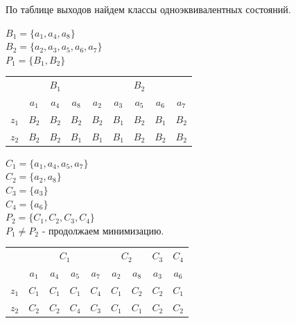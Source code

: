\documentclass[12pt, a4paper]{article}
\begin{document}
По таблице выходов найдем классы одноэквивалентных состояний.

\noindent
$B_1 = \{a_1, a_4, a_8\}$\\
$B_2 = \{a_2, a_3, a_5, a_6, a_7\}$\\
$P_1 = \{B_1, B_2\}$

\begin{tabular}{| c | c | c | c | c | c | c | c | c |}
  \hline
  \multirow{2}{*}{} & \multicolumn{3}{|c|}{$B_1$} & \multicolumn{5}{|c|}{$B_2$}\\
  \cline{2-9}
  & $a_1$ & $a_4$ & $a_8$ & $a_2$ & $a_3$ & $a_5$ & $a_6$ & $a_7$\\
  \hline
  $z_1$ & $B_2$ & $B_2$ & $B_2$ & $B_2$ & $B_1$ & $B_2$ & $B_1$ & $B_2$\\
  \hline
  $z_2$ & $B_2$ & $B_2$ & $B_1$ & $B_1$ & $B_1$ & $B_2$ & $B_2$ & $B_2$\\
  \hline
\end{tabular}

\noindent
$C_1 = \{a_1, a_4, a_5, a_7\}$\\
$C_2 = \{a_2, a_8\}$\\
$C_3 = \{a_3\}$\\
$C_4 = \{a_6\}$\\
$P_2 = \{C_1, C_2, C_3, C_4\}$\\
$P_1 \ne P_2$ - продолжаем минимизацию.

\begin{tabular}{| c | c | c | c | c | c | c | c | c |}
  \hline
  \multirow{2}{*}{} & \multicolumn{4}{|c|}{$C_1$} & \multicolumn{2}{|c|}{$C_2$} & $C_3$ & $C_4$\\
  \cline{2-9}
  & $a_1$ & $a_4$ & $a_5$ & $a_7$ & $a_2$ & $a_8$ & $a_3$ & $a_6$\\
  \hline
  $z_1$ & $C_1$ & $C_1$ & $C_1$ & $C_4$ & $C_1$ & $C_2$ & $C_2$ & $C_1$\\
  \hline
  $z_2$ & $C_2$ & $C_2$ & $C_4$ & $C_3$ & $C_1$ & $C_1$ & $C_2$ & $C_2$\\
  \hline
\end{tabular}
\end{document}
